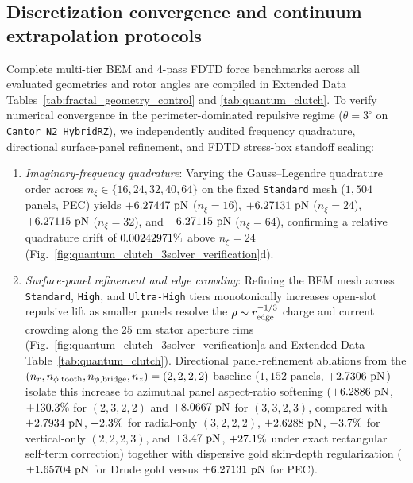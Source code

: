 \documentclass[pdflatex,sn-nature]{sn-jnl}
\begin{document}
\subsection*{Discretization convergence and continuum extrapolation protocols}
Complete multi-tier BEM and 4-pass FDTD force benchmarks across all evaluated geometries and rotor angles are compiled in Extended Data Tables~\ref{tab:fractal_geometry_control} and \ref{tab:quantum_clutch}. To verify numerical convergence in the perimeter-dominated repulsive regime ($\theta=3^\circ$ on \texttt{Cantor\_N2\_HybridRZ}), we independently audited frequency quadrature, directional surface-panel refinement, and FDTD stress-box standoff scaling:
\begin{enumerate}
    \item \emph{Imaginary-frequency quadrature}: Varying the Gauss--Legendre quadrature order across $n_\xi \in \{16, 24, 32, 40, 64\}$ on the fixed \texttt{Standard} mesh ($1{,}504$ panels, PEC) yields $+6.27447{}\text{ pN}$ ($n_\xi=16$), $+6.27131{}\text{ pN}$ ($n_\xi=24$), $+6.27115{}\text{ pN}$ ($n_\xi=32$), and $+6.27115{}\text{ pN}$ ($n_\xi=64$), confirming a relative quadrature drift of $0.00242971{}\%$ above $n_\xi = 24$ (Fig.~\ref{fig:quantum_clutch_3solver_verification}d).
    \item \emph{Surface-panel refinement and edge crowding}: Refining the BEM mesh across \texttt{Standard}, \texttt{High}, and \texttt{Ultra-High} tiers monotonically increases open-slot repulsive lift as smaller panels resolve the $\rho \sim r_{\rm edge}^{-1/3}$ charge and current crowding along the $25\text{ nm}$ stator aperture rims (Fig.~\ref{fig:quantum_clutch_3solver_verification}a and Extended Data Table~\ref{tab:quantum_clutch}). Directional panel-refinement ablations from the $(n_r, n_{\phi,\rm tooth}, n_{\phi,\rm bridge}, n_z) = (2,2,2,2)$ baseline ($1{,}152$ panels, $+2.7306{}\text{ pN}$) isolate this increase to azimuthal panel aspect-ratio softening ($+6.2886{}\text{ pN}$, $+130.3{}\%$ for $(2,3,2,2)$ and $+8.0667{}\text{ pN}$ for $(3,3,2,3)$, compared with $+2.7934{}\text{ pN}$, $+2.3{}\%$ for radial-only $(3,2,2,2)$, $+2.6288{}\text{ pN}$, $-3.7{}\%$ for vertical-only $(2,2,2,3)$, and $+3.47{}\text{ pN}$, $+27.1{}\%$ under exact rectangular self-term correction) together with dispersive gold skin-depth regularization ($+1.65704{}\text{ pN}$ for Drude gold versus $+6.27131{}\text{ pN}$ for PEC).

\end{enumerate}
\end{document}
